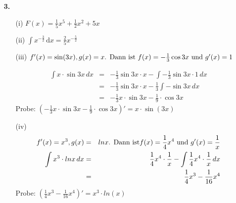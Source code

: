 \documentclass[a4paper,11pt]{scrartcl}
\newcommand{\dx}[0]{\, \mathrm{d}x}
\begin{document}
\begin{enumerate}
\begin{enumerate}
\begin{multicols}{2}
            \end{multicols}
        \end{enumerate}
    \item[\textbf{3.}]
        \begin{enumerate}
            \item[(i)]
                $F(x) = \frac{1}{5}x^5 + \frac{1}{2}x^2 + 5x$ 

            \item[(ii)]
                $\int x^{-\frac{3}{2}} \dx = \frac{2}{5} x^{-\frac{5}{2}}$

            \item[(iii)]
                $f'(x)=\sin (3x) , g(x)=x \textnormal{. Dann ist } f(x)= -\frac{1}{3} \cos 3x \textnormal{ und } g'(x)=1$
            
            \begin{eqnarray}
                \int x\cdot\sin 3x \, dx &=& -\frac{1}{3}\sin 3x \cdot x - \int - \frac{1}{3} \sin 3x \cdot 1 \, dx \nonumber  \\
                &=& -\frac{1}{3}\sin 3x \cdot x - \frac{1}{3} \int -\sin 3x \, dx \nonumber \\ 
                &=&-\frac{1}{3} x \cdot \sin 3x  -\frac{1}{9} \cdot \cos 3x \nonumber \nonumber
            \end{eqnarray}
            Probe: $\left( -\frac{1}{3} x \cdot \sin 3x  -\frac{1}{9} \cdot \cos 3x \right)' = x\cdot\sin (3x)$

            \item[(iv)]
            \begin{eqnarray}
                f'(x)=x^3 , g(x)&=&ln x \textnormal{. Dann ist} f(x)= \frac{1}{4}x^4 \textnormal{ und } g'(x)=\frac{1}{x} \nonumber \\
                \int x^3 \cdot ln x \, dx &=& \frac{1}{4}x^4 \cdot \frac{1}{x} - \int \frac{1}{4}x^4 \cdot \frac{1}{x} \, dx \nonumber  \\ 
                &=& \frac{1}{4}x^3 - \frac{1}{16} x^4 \nonumber
            \end{eqnarray}
            Probe: $\left( \frac{1}{4}x^3 - \frac{1}{16} x^4 \right)' = x^3 \cdot ln(x)$


\end{enumerate}
\end{enumerate}
\end{document}
